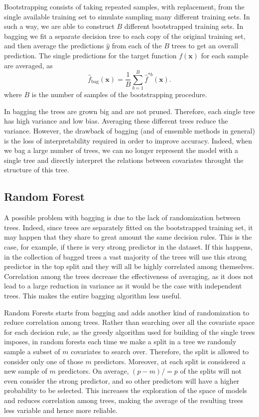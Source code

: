 \documentclass[a4paper,11pt]{article}
\begin{document}
Bootstrapping consists of taking repeated samples, with replacement, from the single available training set to simulate sampling many different training sets. In such a way, we are able to construct $B$ different bootstrapped training sets. In bagging we fit a separate decision tree to each copy of the original training set, and then average the predictions $\hat{y}$ from each of the $B$ trees to get an overall prediction.
The single predictions for the target function $f(\mathbf{x})$ for each sample are averaged, as
\begin{equation}
  \label{eq_bagging}
  \hat{f}_{\text{bag}}(\mathbf{x}) = \frac{1}{B} \sum_{b=1}^{B} \hat{f}^{*b}(\mathbf{x}).
\end{equation}
where $B$ is the number of samples of the bootstrapping procedure.

In bagging the trees are grown big and are not pruned. Therefore, each single tree has high variance and low bias. Averaging these different trees reduce the variance. However, the drawback of bagging (and of ensemble methods in general) is the loss of interpretability required in order to improve accuracy. Indeed, when we bag a large number of trees, we can no longer represent the model with a single tree and directly interpret the relations between covariates throught the structure of this tree.

\subsection{Random Forest}
A possible problem with bagging is due to the lack of randomization between trees. Indeed, since trees are separately fitted on the bootstrapped training set, it may happen that they share to great amount the same decision rules. This is the case, for example, if there is very strong predictor in the dataset. If this happens, in the collection of bagged trees a vast majority of the trees will use this strong predictor in the top split and they will all be highly correlated among themselves. Correlation among the trees decrease the effectiveness of averaging, as it does not lead to a large reduction in variance as it would be the case with independent trees. This makes the entire bagging algorithm less useful. 

Random Forests starts from bagging and adds another kind of randomization to reduce correlation among trees. Rather than searching over all the covariate space for each decision rule, as the greedy algorithm used for building of the single trees imposes, in random forests each time we make a split in a tree we randomly sample a subset of $m$ covariates to search over. Therefore, the split is allowed to consider only one of those $m$ predictors. Moreover, at each split is considered a new sample of $m$ predictors.  On average, $(p - m)/ = p$ of the splits will not even consider the strong predictor, and so other predictors will have a higher probability to be selected. This increases the exploration of the  space of models and reduces correlation among trees, making the average of the resulting trees less variable and hence more reliable. 
\end{document}
